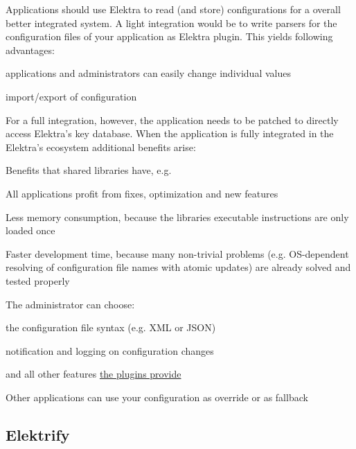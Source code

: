 Applications should use Elektra to read (and store) configurations for a overall better integrated system. A light integration would be to write parsers for the configuration files of your application as Elektra plugin. This yields following advantages\+:


\begin{DoxyItemize}
\item applications and administrators can easily change individual values
\item import/export of configuration
\end{DoxyItemize}

For a full integration, however, the application needs to be patched to directly access Elektra's key database. When the application is fully integrated in the Elektra's ecosystem additional benefits arise\+:


\begin{DoxyItemize}
\item Benefits that shared libraries have, e.\+g.
\begin{DoxyItemize}
\item All applications profit from fixes, optimization and new features
\item Less memory consumption, because the libraries executable instructions are only loaded once
\item Faster development time, because many non-\/trivial problems (e.\+g. O\+S-\/dependent resolving of configuration file names with atomic updates) are already solved and tested properly
\end{DoxyItemize}
\item The administrator can choose\+:
\begin{DoxyItemize}
\item the configuration file syntax (e.\+g. X\+M\+L or J\+S\+O\+N)
\item notification and logging on configuration changes
\item and all other features \hyperlink{md_src_plugins_README_src_plugins_README_md}{the plugins provide}
\end{DoxyItemize}
\item Other applications can use your configuration as override or as fallback
\end{DoxyItemize}

\subsection*{Elektrify}

